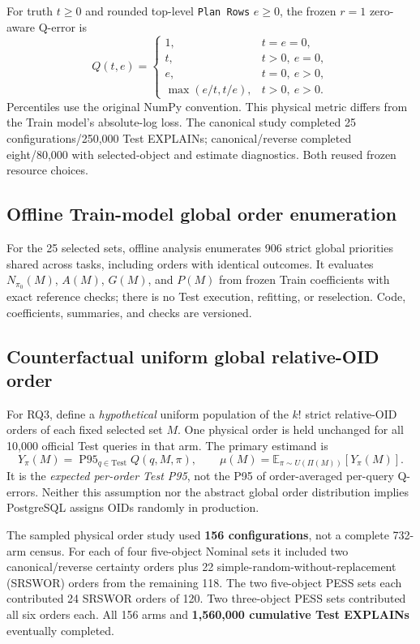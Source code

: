 \documentclass[sigconf, nonacm]{acmart}
\begin{document}
For truth \(t\geq0\) and rounded top-level \texttt{Plan Rows}
\(e\geq0\), the frozen \(r=1\) zero-aware Q-error is
\begin{equation}
\label{eq:qerror}
Q(t,e)=
\begin{cases}
1,&t=e=0,\\
t,&t>0,\ e=0,\\
e,&t=0,\ e>0,\\
\max(e/t,t/e),&t>0,\ e>0.
\end{cases}
\end{equation}
Percentiles use the original NumPy convention. This physical metric
differs from the Train model's absolute-log loss. The canonical study
completed 25 configurations/250,000 Test EXPLAINs; canonical/reverse
completed eight/80,000 with selected-object and estimate diagnostics.
Both reused frozen resource choices.

\subsection{Offline Train-model global order enumeration}
For the 25 selected sets, offline analysis enumerates 906 strict
global priorities shared across tasks, including orders with identical
outcomes. It evaluates \(N_{\pi_0}(M)\), \(A(M)\), \(G(M)\), and
\(P(M)\) from frozen Train coefficients with exact reference checks;
there is no Test execution, refitting, or reselection. Code,
coefficients, summaries, and checks are versioned.

\subsection{Counterfactual uniform global relative-OID order}
For RQ3, define a \emph{hypothetical} uniform population of
the \(k!\) strict relative-OID orders of each fixed selected set
\(M\). One physical order is held unchanged for all
10,000 official Test queries in that arm. The primary estimand is
\begin{equation}
\label{eq:estimand}
Y_\pi(M)=\operatorname{P95}_{q\in\mathrm{Test}}Q(q,M,\pi),
\qquad
\mu(M)=\mathbb E_{\pi\sim U(\Pi(M))}[Y_\pi(M)].
\end{equation}
It is the \emph{expected per-order Test P95}, not the P95
of order-averaged per-query Q-errors. Neither this assumption
nor the abstract global order distribution implies PostgreSQL
assigns OIDs randomly in production.

The sampled physical order study used \textbf{156 configurations},
not a complete 732-arm census. For each of four five-object
Nominal sets it included two canonical/reverse certainty orders
plus 22 simple-random-without-replacement (SRSWOR) orders
from the remaining 118. The two five-object PESS sets each
contributed 24 SRSWOR orders of 120. Two three-object PESS
sets contributed all six orders each. All 156 arms and
\textbf{1,560,000 cumulative Test EXPLAINs} eventually completed.
\end{document}
